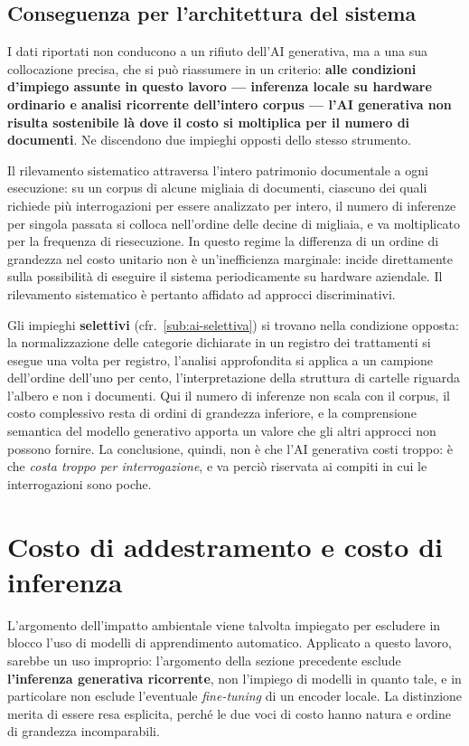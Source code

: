\subsection{Conseguenza per l'architettura del sistema}
I dati riportati non conducono a un rifiuto dell'AI generativa, ma a una sua collocazione precisa, che si può riassumere in un criterio: \textbf{alle condizioni d'impiego assunte in questo lavoro --- inferenza locale su hardware ordinario e analisi ricorrente dell'intero corpus --- l'AI generativa non risulta sostenibile là dove il costo si moltiplica per il numero di documenti}. Ne discendono due impieghi opposti dello stesso strumento. \medskip

Il rilevamento sistematico attraversa l'intero patrimonio documentale a ogni esecuzione: su un corpus di alcune migliaia di documenti, ciascuno dei quali richiede più interrogazioni per essere analizzato per intero, il numero di inferenze per singola passata si colloca nell'ordine delle decine di migliaia, e va moltiplicato per la frequenza di riesecuzione. In questo regime la differenza di un ordine di grandezza nel costo unitario non è un'inefficienza marginale: incide direttamente sulla possibilità di eseguire il sistema periodicamente su hardware aziendale. Il rilevamento sistematico è pertanto affidato ad approcci discriminativi. \medskip

Gli impieghi \textbf{selettivi} (cfr.~\ref{sub:ai-selettiva}) si trovano nella condizione opposta: la normalizzazione delle categorie dichiarate in un registro dei trattamenti si esegue una volta per registro, l'analisi approfondita si applica a un campione dell'ordine dell'uno per cento, l'interpretazione della struttura di cartelle riguarda l'albero e non i documenti. Qui il numero di inferenze non scala con il corpus, il costo complessivo resta di ordini di grandezza inferiore, e la comprensione semantica del modello generativo apporta un valore che gli altri approcci non possono fornire. La conclusione, quindi, non è che l'AI generativa costi troppo: è che \emph{costa troppo per interrogazione}, e va perciò riservata ai compiti in cui le interrogazioni sono poche.

\section{Costo di addestramento e costo di inferenza}
\label{sec:considerazioni-training}
L'argomento dell'impatto ambientale viene talvolta impiegato per escludere in blocco l'uso di modelli di apprendimento automatico. Applicato a questo lavoro, sarebbe un uso improprio: l'argomento della sezione precedente esclude \textbf{l'inferenza generativa ricorrente}, non l'impiego di modelli in quanto tale, e in particolare non esclude l'eventuale \emph{fine-tuning} di un encoder locale. La distinzione merita di essere resa esplicita, perché le due voci di costo hanno natura e ordine di grandezza incomparabili. \medskip


